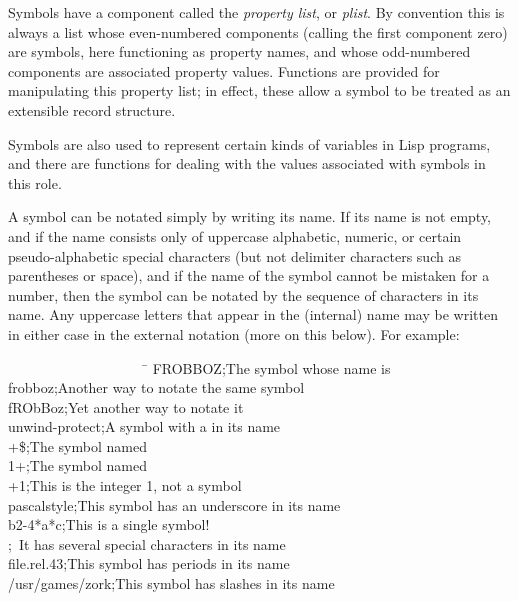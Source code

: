 Symbols have a component called the \emph{property list}, or \emph{plist}.
By convention this is always a list whose even-numbered
components (calling the first component zero) are symbols,
here functioning as property names, and whose odd-numbered components
are associated property values.  Functions are provided for manipulating
this property list; in effect, these allow a symbol to be treated as an
extensible record structure.

Symbols are also used to represent certain kinds of variables in Lisp
programs, and there are functions for dealing with the values associated
with symbols in this role. 

A symbol can be notated simply by writing its name.
If its name is not empty, and if the name consists only of
uppercase alphabetic, numeric, or certain pseudo-alphabetic
special characters (but not
delimiter characters such as parentheses or space), and if
the name of the symbol cannot be mistaken for a number, then
the symbol can be notated by the sequence of characters in its name.
Any uppercase letters that appear in the (internal) name may
be written in either case in the external notation (more on this below).
For example:
\begin{lisp}
~~~~~~~~~~~~~~~~~~~~\=\kill
FROBBOZ\>;\textrm{The symbol whose name is } \\
frobboz\>;\textrm{Another way to notate the same symbol} \\
fRObBoz\>;\textrm{Yet another way to notate it} \\
unwind-protect\>;\textrm{A symbol with a \cdf{-} in its name} \\
+\$\>;\textrm{The symbol named \cd{+\$}} \\
1+\>;\textrm{The symbol named } \\
+1\>;\textrm{This is the integer 1, not a symbol} \\
pascal{\Xunderscore}style\>;\textrm{This symbol has an underscore in its name} \\
b{\Xcircumflex}2-4*a*c\>;\textrm{This is a single symbol!} \\
\>;~\textrm{It has several special characters in its name} \\
file.rel.43\>;\textrm{This symbol has periods in its name} \\
/usr/games/zork\>;\textrm{This symbol has slashes in its name}
\end{lisp}

